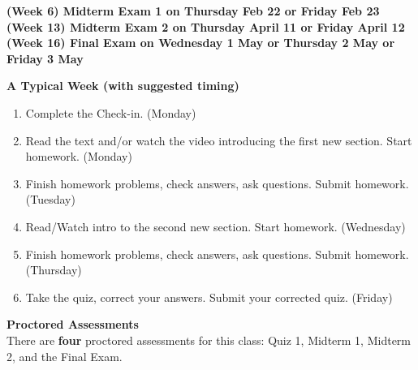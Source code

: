\documentclass[12pt]{article}
\renewcommand{\emph}[1]{\textsf{\textbf{#1}}}
\newcommand{\localhead}[1]{\par\smallskip\textbf{#1} \smallskip\nobreak\\}%
\def\heading#1{\localhead{\large\emph{#1}}}
\begin{document}
\emph{(Week 6) Midterm Exam 1 on Thursday Feb 22 or Friday Feb 23} \\
\emph{(Week 13) Midterm Exam 2 on Thursday April 11 or Friday April 12}  \\
\emph{(Week 16) Final Exam on Wednesday 1 May or Thursday 2 May or Friday 3 May}\\ 

\heading{A Typical Week (with suggested timing)}
\vspace*{-.2in}
\begin{enumerate}
\item Complete the Check-in. (Monday) 
\item Read the text and/or watch the video introducing the first new section. Start homework.  (Monday)
\item Finish homework problems, check answers, ask questions. Submit homework.  (Tuesday)
\item Read/Watch intro to the second new section. Start homework.  (Wednesday)
\item Finish homework problems, check answers, ask questions. Submit homework. (Thursday)
\item Take the quiz, correct your answers. Submit your corrected quiz.  (Friday)
\end{enumerate}

\heading{Proctored Assessments}
There are \emph{four} proctored assessments for this class:
Quiz 1, Midterm 1, Midterm 2, and the Final Exam. 
\end{document}
